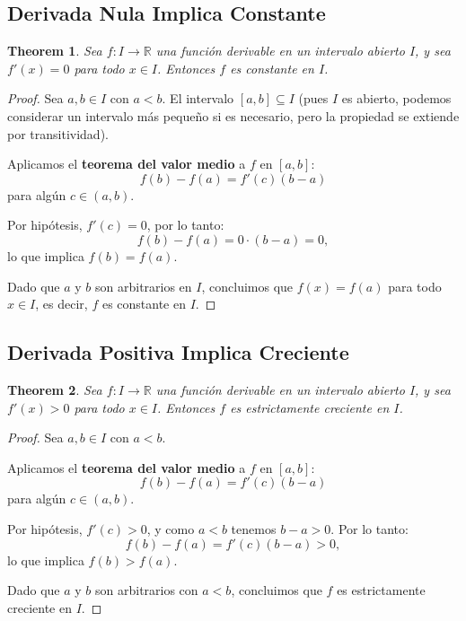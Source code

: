 \documentclass[11pt,a4paper]{article}
\theoremstyle{plain}
\newtheorem{theorem}{Theorem}[section]
\theoremstyle{definition}
\begin{document}
\subsection{Derivada Nula Implica Constante}

\begin{theorem}
Sea $f: I \to \mathbb{R}$ una función derivable en un intervalo abierto $I$, y sea $f'(x) = 0$ para todo $x \in I$. Entonces $f$ es constante en $I$.
\end{theorem}

\begin{proof}
Sea $a, b \in I$ con $a < b$. El intervalo $[a,b] \subseteq I$ (pues $I$ es abierto, podemos considerar un intervalo más pequeño si es necesario, pero la propiedad se extiende por transitividad).

Aplicamos el \textbf{teorema del valor medio} a $f$ en $[a,b]$:
\[
f(b) - f(a) = f'(c)(b - a)
\]
para algún $c \in (a,b)$.

Por hipótesis, $f'(c) = 0$, por lo tanto:
\[
f(b) - f(a) = 0 \cdot (b - a) = 0,
\]
lo que implica $f(b) = f(a)$.

Dado que $a$ y $b$ son arbitrarios en $I$, concluimos que $f(x) = f(a)$ para todo $x \in I$, es decir, $f$ es constante en $I$.
\end{proof}

\subsection{Derivada Positiva Implica Creciente}

\begin{theorem}
Sea $f: I \to \mathbb{R}$ una función derivable en un intervalo abierto $I$, y sea $f'(x) > 0$ para todo $x \in I$. Entonces $f$ es estrictamente creciente en $I$.
\end{theorem}

\begin{proof}
Sea $a, b \in I$ con $a < b$.

Aplicamos el \textbf{teorema del valor medio} a $f$ en $[a,b]$:
\[
f(b) - f(a) = f'(c)(b - a)
\]
para algún $c \in (a,b)$.

Por hipótesis, $f'(c) > 0$, y como $a < b$ tenemos $b - a > 0$. Por lo tanto:
\[
f(b) - f(a) = f'(c)(b - a) > 0,
\]
lo que implica $f(b) > f(a)$.

Dado que $a$ y $b$ son arbitrarios con $a < b$, concluimos que $f$ es estrictamente creciente en $I$.
\end{proof}
\end{document}
